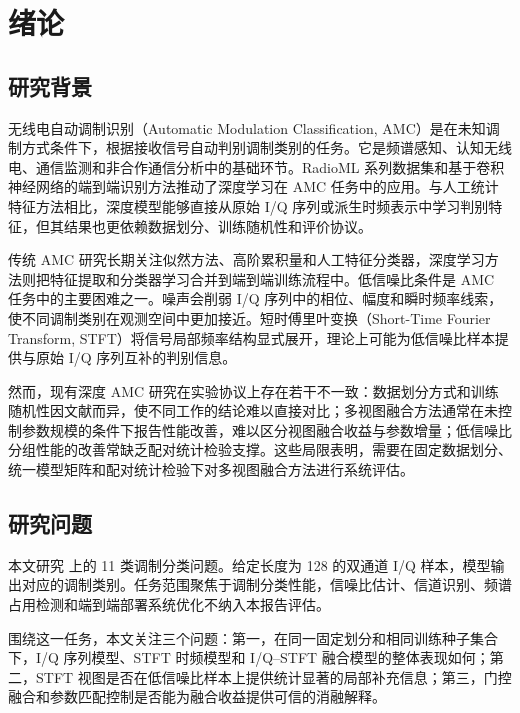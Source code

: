 \chapter{绪论}

\section{研究背景}

无线电自动调制识别（Automatic Modulation Classification, AMC）是在未知调制方式条件下，根据接收信号自动判别调制类别的任务。它是频谱感知、认知无线电、通信监测和非合作通信分析中的基础环节。RadioML 系列数据集和基于卷积神经网络的端到端识别方法推动了深度学习在 AMC 任务中的应用\cite{oshea2016radioml,oshea2016cnn,west2017deep}。与人工统计特征方法相比，深度模型能够直接从原始 I/Q 序列或派生时频表示中学习判别特征，但其结果也更依赖数据划分、训练随机性和评价协议。

传统 AMC 研究长期关注似然方法、高阶累积量和人工特征分类器\cite{azzouz1996amr,swami2000cumulants,dobre2007survey,hameed2009likelihood}，深度学习方法则把特征提取和分类器学习合并到端到端训练流程中。低信噪比条件是 AMC 任务中的主要困难之一。噪声会削弱 I/Q 序列中的相位、幅度和瞬时频率线索，使不同调制类别在观测空间中更加接近。短时傅里叶变换（Short-Time Fourier Transform, STFT）将信号局部频率结构显式展开\cite{oppenheim2010dtsp,allen1977shorttime,griffin1984stft,cohen1995timefrequency,boashash2015timefrequency}，理论上可能为低信噪比样本提供与原始 I/Q 序列互补的判别信息。

然而，现有深度 AMC 研究在实验协议上存在若干不一致：数据划分方式和训练随机性因文献而异，使不同工作的结论难以直接对比；多视图融合方法通常在未控制参数规模的条件下报告性能改善，难以区分视图融合收益与参数增量；低信噪比分组性能的改善常缺乏配对统计检验支撑。这些局限表明，需要在固定数据划分、统一模型矩阵和配对统计检验下对多视图融合方法进行系统评估。


\section{研究问题}

本文研究 \datasetname{} 上的 11 类调制分类问题。给定长度为 128 的双通道 I/Q 样本，模型输出对应的调制类别。任务范围聚焦于调制分类性能，信噪比估计、信道识别、频谱占用检测和端到端部署系统优化不纳入本报告评估。

围绕这一任务，本文关注三个问题：第一，在同一固定划分和相同训练种子集合下，I/Q 序列模型、STFT 时频模型和 I/Q--STFT 融合模型的整体表现如何；第二，STFT 视图是否在低信噪比样本上提供统计显著的局部补充信息；第三，门控融合和参数匹配控制是否能为融合收益提供可信的消融解释。

